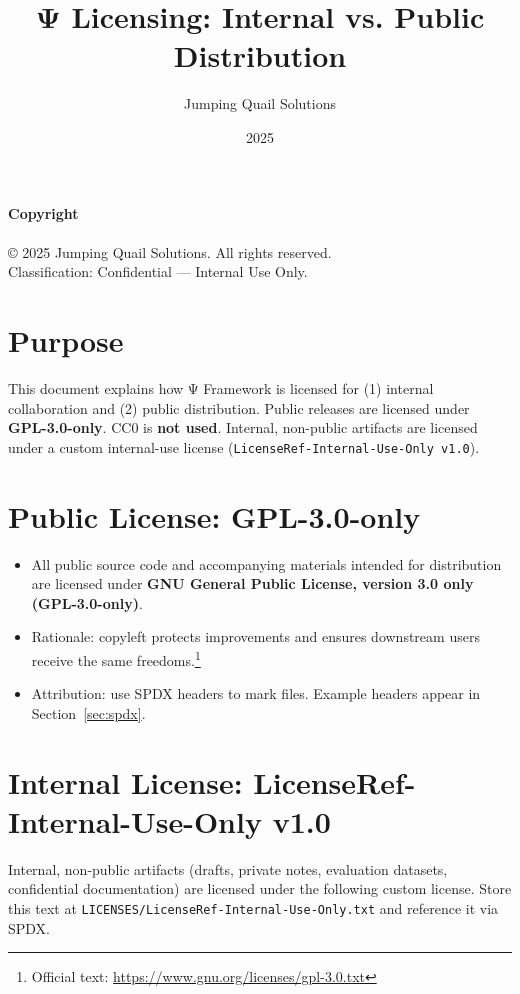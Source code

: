 \documentclass[11pt]{article}
\title{Ψ Licensing: Internal vs. Public Distribution}
\author{Jumping Quail Solutions}
\date{2025}
\newcommand{\proj}{Ψ Framework}
\begin{document}
\maketitle

\noindent\textbf{Copyright} \\[-0.3em]
\\© 2025 Jumping Quail Solutions. All rights reserved.\\
Classification: Confidential — Internal Use Only.\\

\section*{Purpose}
This document explains how \proj{} is licensed for (1) internal collaboration and (2) public distribution. Public releases are licensed under \textbf{GPL-3.0-only}. CC0 is \textbf{not used}. Internal, non-public artifacts are licensed under a custom internal-use license (\texttt{LicenseRef-Internal-Use-Only v1.0}).

\section*{Public License: GPL-3.0-only}
\begin{itemize}[leftmargin=*]
  \item All public source code and accompanying materials intended for distribution are licensed under \textbf{GNU General Public License, version 3.0 only (GPL-3.0-only)}.
  \item Rationale: copyleft protects improvements and ensures downstream users receive the same freedoms.\footnote{Official text: \url{https://www.gnu.org/licenses/gpl-3.0.txt}}
  \item Attribution: use SPDX headers to mark files. Example headers appear in Section~\ref{sec:spdx}.
\end{itemize}

\section*{Internal License: LicenseRef-Internal-Use-Only v1.0}
Internal, non-public artifacts (drafts, private notes, evaluation datasets, confidential documentation) are licensed under the following custom license. Store this text at \texttt{LICENSES/LicenseRef-Internal-Use-Only.txt} and reference it via SPDX.
\end{document}
